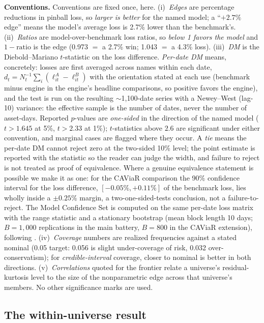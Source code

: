 \documentclass[11pt]{article}
\theoremstyle{remark}
\begin{document}
\noindent\textbf{Conventions.}
Conventions are fixed once, here. (i)~\emph{Edges} are percentage
reductions in pinball loss, so \emph{larger is better} for the named
model; a ``$+2.7\%$ edge'' means the model's average loss is 2.7\%
lower than the benchmark's. (ii)~\emph{Ratios} are model-over-benchmark
loss ratios, so \emph{below 1 favors the model} and $1-\text{ratio}$ is
the edge (0.973 $=$ a 2.7\% win; 1.043 $=$ a 4.3\% loss).
(iii)~\emph{DM} is the Diebold--Mariano $t$-statistic on the loss
difference. \emph{Per-date DM} means, concretely: losses are first
averaged across names within each date,
$d_t = N_t^{-1}\sum_i (\ell^{A}_{it} - \ell^{B}_{it})$ with the
orientation stated at each use (benchmark minus engine in the engine's
headline comparisons, so positive favors the engine), and the test is
run on the resulting $\sim$1{,}100-date series with a Newey--West
(lag-10) variance: the effective sample is the number of dates, never
the number of asset-days. Reported $p$-values are \emph{one-sided} in
the direction of the named model ($t>1.645$ at 5\%, $t>2.33$ at 1\%);
$t$-statistics above $2.6$ are significant under either convention, and
marginal cases are flagged where they occur. A \emph{tie} means the
per-date DM cannot reject zero at the two-sided 10\% level; the point
estimate is reported with the statistic so the reader can judge the
width, and failure to reject is not treated as proof of equivalence.
Where a genuine equivalence statement is possible we make it as one: for the CAViaR comparison the 90\% confidence interval for
the loss difference, $[-0.05\%,+0.11\%]$ of the benchmark loss, lies wholly inside a $\pm0.25\%$ margin, a two-one-sided-tests conclusion, not a failure-to-reject. The Model Confidence Set is
computed on the same per-date loss matrix with the range statistic and a
stationary bootstrap (mean block length 10 days; $B=1{,}000$ replications
in the main battery, $B=800$ in the CAViaR extension),
following \citet{hansen2011mcs}. (iv)~\emph{Coverage}
numbers are realized frequencies against a stated nominal (0.05 target:
0.056 is slight under-coverage of risk, 0.032 over-conservatism); for
\emph{credible-interval} coverage, closer to nominal is better in both
directions. (v)~\emph{Correlations} quoted for the frontier relate a universe's
residual-kurtosis level to the size of the nonparametric edge across
that universe's members. No other significance marks are used.

\subsection{The within-universe result}
\end{document}
